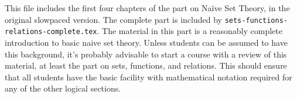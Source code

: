 \documentclass[../../include/open-logic-part]{subfiles}
\begin{document}

\begin{editorial}
  This file includes the first four chapters of the part on Na\"ive
  Set Theory, in the original slowpaced version. The complete part is
  included by \verb|sets-functions-relations-complete.tex|. The
  material in this part is a reasonably complete introduction to basic
  naive set theory. Unless students can be assumed to have this
  background, it's probably advisable to start a course with a review
  of this material, at least the part on sets, functions, and
  relations. This should ensure that all students have the basic
  facility with mathematical notation required for any of the other
  logical sections.
\end{editorial}





\OLEndPartHook
\end{document}

